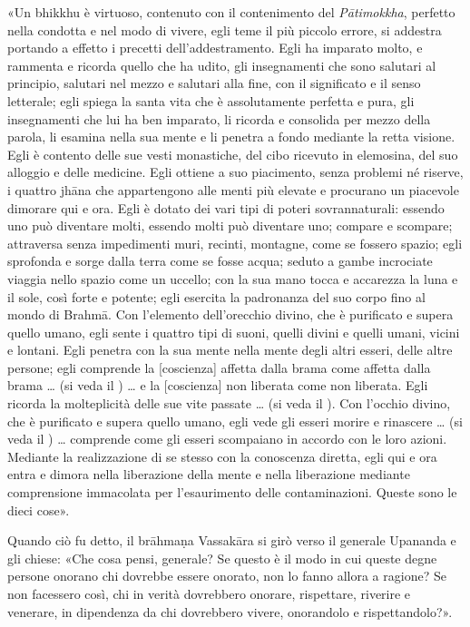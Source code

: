 «Un bhikkhu è virtuoso, contenuto con il contenimento del \emph{Pātimokkha},
perfetto nella condotta e nel modo di vivere, egli teme il più piccolo errore,
si addestra portando a effetto i precetti dell’addestramento. Egli ha imparato
molto, e rammenta e ricorda quello che ha udito, gli insegnamenti che sono
salutari al principio, salutari nel mezzo e salutari alla fine, con il
significato e il senso letterale; egli spiega la santa vita che è assolutamente
perfetta e pura, gli insegnamenti che lui ha ben imparato, li ricorda e
consolida per mezzo della parola, li esamina nella sua mente e li penetra a
fondo mediante la retta visione. Egli è contento delle sue vesti monastiche, del
cibo ricevuto in elemosina, del suo alloggio e delle medicine. Egli ottiene a
suo piacimento, senza problemi né riserve, i quattro jhāna che appartengono alle
menti più elevate e procurano un piacevole dimorare qui e ora. Egli è dotato dei
vari tipi di poteri sovrannaturali: essendo uno può diventare molti, essendo
molti può diventare uno; compare e scompare; attraversa senza impedimenti muri,
recinti, montagne, come se fossero spazio; egli sprofonda e sorge dalla terra
come se fosse acqua; seduto a gambe incrociate viaggia nello spazio come un
uccello; con la sua mano tocca e accarezza la luna e il sole, così forte e
potente; egli esercita la padronanza del suo corpo fino al mondo di Brahmā. Con
l’elemento dell’orecchio divino, che è purificato e supera quello umano, egli
sente i quattro tipi di suoni, quelli divini e quelli umani, vicini e lontani.
Egli penetra con la sua mente nella mente degli altri esseri, delle altre
persone; egli comprende la [coscienza] affetta dalla brama come affetta dalla
brama … (si veda il \hyperlink{cap-12-La-Dottrina#pag272}{}) … e la [coscienza]
non liberata come non liberata. Egli ricorda la molteplicità delle sue vite
passate … (si veda il
\hyperlink{cap-02-Lo-sforzo-per-l-illuminazione#pag27b}{}). Con l’occhio divino,
che è purificato e supera quello umano, egli vede gli esseri morire e rinascere
… (si veda il \hyperlink{cap-02-Lo-sforzo-per-l-illuminazione#pag28}{}) …
comprende come gli esseri scompaiano in accordo con le loro azioni. Mediante la
realizzazione di se stesso con la conoscenza diretta, egli qui e ora entra e
dimora nella liberazione della mente e nella liberazione mediante comprensione
immacolata per l’esaurimento delle contaminazioni. Queste sono le dieci cose».

Quando ciò fu detto, il brāhmaṇa Vassakāra si girò verso il generale Upananda e
gli chiese: «Che cosa pensi, generale? Se questo è il modo in cui queste degne
persone onorano chi dovrebbe essere onorato, non lo fanno allora a ragione? Se
non facessero così, chi in verità dovrebbero onorare, rispettare, riverire e
venerare, in dipendenza da chi dovrebbero vivere, onorandolo e rispettandolo?».

